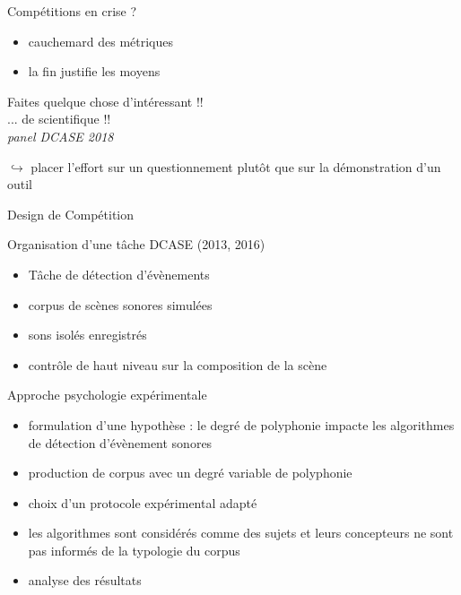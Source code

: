 \begin{frame}{Compétitions en crise ?}
\begin{itemize}
    \item cauchemard des métriques
    \item \og la fin justifie les moyens \fg
\end{itemize}
\vspace{.8cm}
\begin{center}
\og Faites quelque chose d'intéressant !! \fg \\
\og ... de scientifique !! \fg \\
\hfill \textit{panel DCASE 2018}
\end{center}
\vspace{.8cm}
$\hookrightarrow{}$ placer l'effort sur un questionnement plutôt que sur la démonstration d'un outil
\end{frame}

\begin{frame}{Design de Compétition}
\begin{block}{Organisation d'une tâche DCASE (2013, 2016)}
\begin{itemize}
\item Tâche de détection d'évènements
\item corpus de scènes sonores simulées
\item sons isolés enregistrés
\item contrôle de haut niveau sur la composition de la scène
\end{itemize}
\end{block} 
\end{frame}

\begin{frame}{Approche  \og psychologie expérimentale \fg}
\begin{itemize}
\item formulation d'une hypothèse : le degré de polyphonie impacte les algorithmes de détection d'évènement sonores
\item production de corpus avec un degré variable de polyphonie
\item choix d'un protocole expérimental adapté
\item les algorithmes sont considérés comme des sujets et leurs concepteurs ne sont pas informés de la typologie du corpus
\item analyse des résultats
\end{itemize} 
\end{frame}

